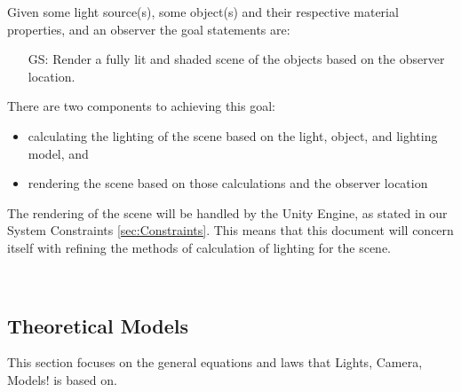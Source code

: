 \documentclass[12pt]{article}
\newcounter{goalnum} %
\newcommand{\famname}{Lights, Camera, Models!} %
\begin{document}
\noindent Given some light source(s), some object(s) and their respective 
material properties, and an observer the goal statements are:

\begin{itemize}

\item[GS\refstepcounter{goalnum}\thegoalnum \label{gs-display}:] 
Render a fully lit and shaded scene of the objects based on the observer 
location.

\end{itemize}

There are two components to achieving this goal: 
\begin{itemize}
	\item calculating the lighting of the scene based on the light, object, and 
	lighting model, and
	\item rendering the scene based on those calculations and the observer 
	location
\end{itemize}

The rendering of the scene will be handled by the Unity Engine, as stated in 
our System Constraints \ref{sec:Constraints}. This means that this document 
will concern itself with refining the methods of calculation of lighting for 
the scene.

\\

\subsection{Theoretical Models} \label{sec_theoretical}

This section focuses on the general equations and laws that \famname{} is based
on.  %

~\newline
\end{document}

